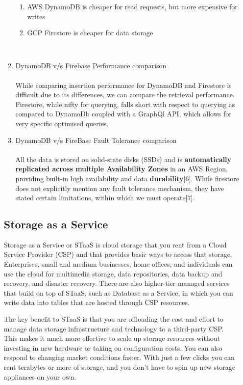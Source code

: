 \begin{enumerate}[label=\Alph*.]
\begin{enumerate}[label=\arabic*.]
    \begin{enumerate}[label=\arabic*.]
      \item AWS DynamoDB is cheaper for read requests, but more expensive for writes
      \item GCP Firestore is cheaper for data storage
    \end{enumerate}
    \\
  \item DynamoDB v/s Firebase Performance comparison \\ \\
    While comparing insertion performance for DynamoDB and Firestore is difficult due to its differences, we can compare the retrieval performance. Firestore, while nifty for querying, falls short with respect to querying as compared to DynamoDb coupled with a GraphQl API, which allows for very specific optimised queries.
    \\
  \item DynamoDB v/s FireBase Fault Tolerance comparison \\ \\
    All the data is stored on solid-state disks (SSDs) and is \textbf{automatically replicated across multiple Availability Zones} in an AWS Region, providing built-in high availability and data \textbf{durability}[6].
    \bigskip
    While firestore does not explicitly mention any fault tolerance mechanism, they have stated certain limitations, within which we must operate[7].
    \\
\end{enumerate}

\subsection{Storage as a Service}

Storage as a Service or STaaS is cloud storage that you rent from a Cloud Service Provider (CSP) and that provides basic ways to access that storage. Enterprises, small and medium businesses, home offices, and individuals can use the cloud for multimedia storage, data repositories, data backup and recovery, and disaster recovery. There are also higher-tier managed services that build on top of STaaS, such as Database as a Service, in which you can write data into tables that are hosted through CSP resources.

\bigskip


The key benefit to STaaS is that you are offloading the cost and effort to manage data storage infrastructure and technology to a third-party CSP. This makes it much more effective to scale up storage resources without investing in new hardware or taking on configuration costs. You can also respond to changing market conditions faster. With just a few clicks you can rent terabytes or more of storage, and you don’t have to spin up new storage appliances on your own.
\bigskip


\end{enumerate}
